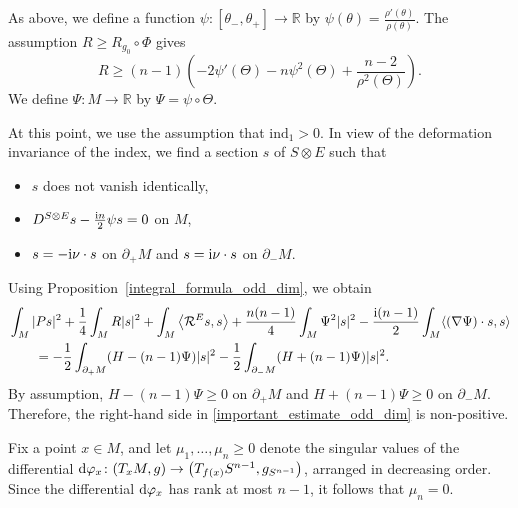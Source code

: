 \documentclass[pdftex]{sigma}
\numberwithin{equation}{section}
\newcommand{\R}{\mathbb{R}}
\begin{document}
As above, we define a function $\psi\colon [\theta_-,\theta_+] \to \R$ by $\psi(\theta) = \frac{\rho'(\theta)}{\rho(\theta)}$. The assumption $R \geq R_{g_0} \circ \Phi$ gives
\begin{equation} \label{ineq_for_scal_odd_dim}
R \geq (n-1) \left( -2 \psi'(\Theta) - n \psi^2(\Theta) + \frac{n-2}{\rho^2(\Theta)} \right).
\end{equation}
We define $\Psi\colon M \to \R$ by $\Psi = \psi \circ \Theta$.

At this point, we use the assumption that $\mathrm{ind}_1 > 0$. In view of the deformation invariance of the index, we find a section $s$ of $S \otimes E$ such that
\begin{itemize}\itemsep=0pt
 \item $s$ does not vanish identically,
 \item $D^{S \otimes E } s - \frac{{\rm i}n}{2} \psi s = 0$ on $M$,
 \item $s = -{\rm i} \nu \cdot s$ on $\partial_+ M$ and $s = {\rm i} \nu \cdot s$ on $\partial_- M$.
\end{itemize}
Using Proposition~\ref{integral_formula_odd_dim}, we obtain
\begin{align}
&\int_M |P s|^2 + \frac{1}{4} \int_M R |s|^2
+ \int_M \big\langle \mathcal{R}^E s,s \big\rangle + \frac{n(n-1)}{4} \int_M \Psi^2 |s|^2 - \frac{{\rm i}(n-1)}{2} \int_M \langle (\nabla \Psi) \cdot s,s \rangle\nonumber \\
&\qquad= -\frac{1}{2} \int_{\partial_+ M} (H-(n-1)\Psi) |s|^2 - \frac{1}{2} \int_{\partial_- M} (H+(n-1)\Psi) |s|^2. \label{important_estimate_odd_dim}
\end{align}
By assumption, $H-(n-1)\Psi \geq 0$ on $\partial_+ M$ and $H +(n-1)\Psi \geq 0$ on $\partial_- M$. Therefore, the right-hand side in \eqref{important_estimate_odd_dim} is non-positive.

Fix a point $x \in M $, and let $ \mu_1,\hdots,\mu_n \geq 0$ denote the singular values of the differential ${\rm d}\varphi_x\colon (T_x M,g ) \to \big(T_{f(x)} S^{n-1} ,g_{S^{n-1}}\big)$, arranged in decreasing order. Since the differential ${\rm d}\varphi_x$ has rank at most $n-1$, it follows that $\mu_n = 0$.
\end{document}
